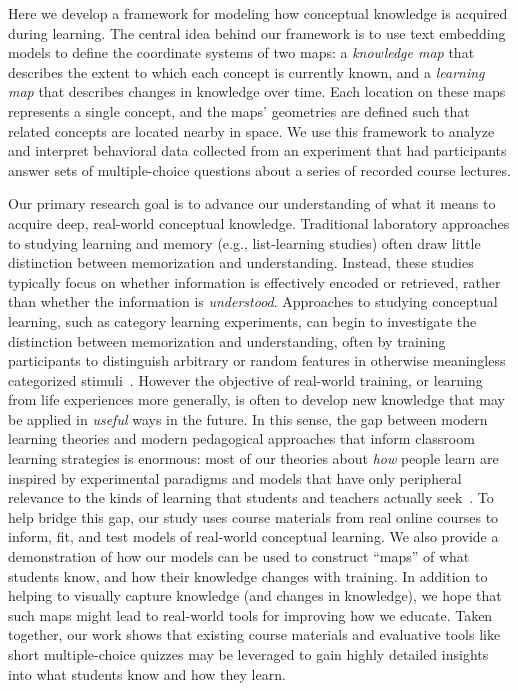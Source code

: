 \documentclass[10pt]{article}
\begin{document}
Here we develop a framework for modeling how conceptual knowledge is acquired
during learning. The central idea behind our framework is to use text embedding
models to define the coordinate systems of two maps: a \textit{knowledge
map} that describes the extent to which each concept is currently known, and
a \textit{learning map} that describes changes in knowledge over time. Each
location on these maps represents a single concept, and the maps' geometries
are defined such that related concepts are located nearby in space. We use this
framework to analyze and interpret behavioral data collected from an experiment
that had participants answer sets of multiple-choice questions about a series of
recorded course lectures.

Our primary research goal is to advance our understanding of what it means to
acquire deep, real-world conceptual knowledge. Traditional laboratory
approaches to studying learning and memory (e.g., list-learning studies) often
draw little distinction between memorization and understanding. Instead, these
studies typically focus on whether information is effectively encoded or
retrieved, rather than whether the information is \textit{understood}.
Approaches to studying conceptual learning, such as category learning
experiments, can begin to investigate the distinction between memorization and
understanding, often by training participants to distinguish arbitrary or
random features in otherwise meaningless categorized stimuli~\citep{ReilEtal82, Este86a, Este86b, GlucEtal02, AshbMadd05, HulbNorm15}. However the
objective of real-world training, or learning from life experiences more
generally, is often to develop new knowledge that may be applied in
\textit{useful} ways in the future. In this sense, the gap between modern
learning theories and modern pedagogical approaches that inform classroom
learning strategies is enormous: most of our theories about \textit{how} people
learn are inspired by experimental paradigms and models that have only
peripheral relevance to the kinds of learning that students and teachers
actually seek~\citep{Macl05, HallGree08}. To help bridge this gap, our study
uses course materials from real online courses to inform, fit, and test models
of real-world conceptual learning. We also provide a demonstration of how our
models can be used to construct ``maps'' of what students know, and how their
knowledge changes with training. In addition to helping to visually capture knowledge
(and changes in knowledge), we hope that such maps might lead to real-world
tools for improving how we educate. Taken together, our work shows that
existing course materials and evaluative tools like short multiple-choice
quizzes may be leveraged to gain highly detailed insights into what students
know and how they learn.
\end{document}
